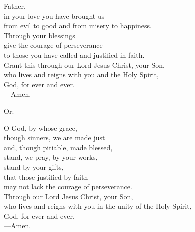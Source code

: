 \prayer


\begin{prayerverse}
Father,\\
in your love you have brought us\\
from evil to good and from misery to happiness.\\
Through your blessings\\
give the courage of perseverance\\
to those you have called and justified in faith.\\
Grant this through our Lord Jesus Christ, your Son,\\
who lives and reigns with you and the Holy Spirit,\\
God, for ever and ever.\\
{\color{red}---\thinspace}Amen.

{\color{red}Or:}

O God, by whose grace,\\
though sinners, we are made just\\
and, though pitiable, made blessed,\\
stand, we pray, by your works,\\
stand by your gifts,\\
that those justified by faith\\
may not lack the courage of perseverance.\\
Through our Lord Jesus Christ, your Son,\\
who lives and reigns with you in the unity of the Holy Spirit,\\
God, for ever and ever.\\
{\color{red}---\thinspace}Amen.
\end{prayerverse}

